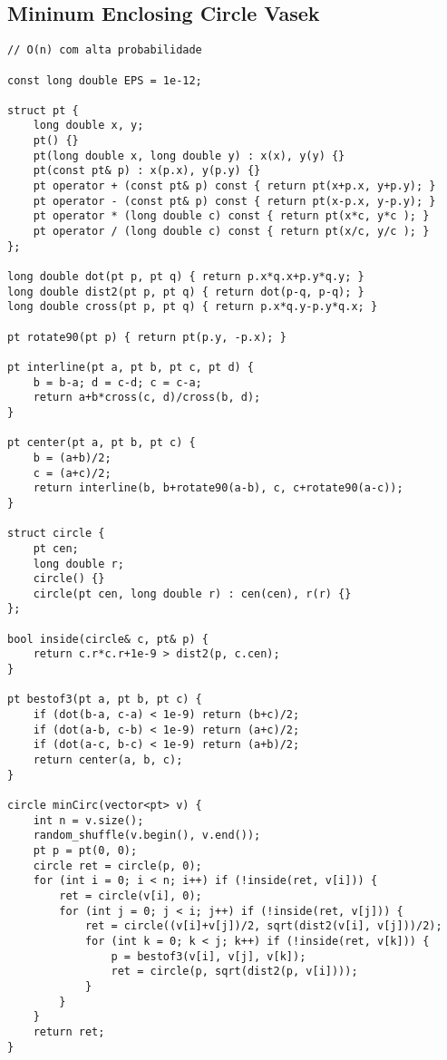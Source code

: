 \documentclass[12pt, a4paper, twoside]{article}
\begin{document}
\subsection{Mininum Enclosing Circle Vasek}
\begin{lstlisting}
// O(n) com alta probabilidade

const long double EPS = 1e-12;

struct pt {
	long double x, y;
	pt() {}
	pt(long double x, long double y) : x(x), y(y) {}
	pt(const pt& p) : x(p.x), y(p.y) {}
	pt operator + (const pt& p) const { return pt(x+p.x, y+p.y); }
	pt operator - (const pt& p) const { return pt(x-p.x, y-p.y); }
	pt operator * (long double c) const { return pt(x*c, y*c ); }
	pt operator / (long double c) const { return pt(x/c, y/c ); }
};

long double dot(pt p, pt q) { return p.x*q.x+p.y*q.y; }
long double dist2(pt p, pt q) { return dot(p-q, p-q); }
long double cross(pt p, pt q) { return p.x*q.y-p.y*q.x; }

pt rotate90(pt p) { return pt(p.y, -p.x); }

pt interline(pt a, pt b, pt c, pt d) {
	b = b-a; d = c-d; c = c-a;
	return a+b*cross(c, d)/cross(b, d);	
}

pt center(pt a, pt b, pt c) {
	b = (a+b)/2;
	c = (a+c)/2;
	return interline(b, b+rotate90(a-b), c, c+rotate90(a-c));	
}

struct circle {
	pt cen;
	long double r;
	circle() {}
	circle(pt cen, long double r) : cen(cen), r(r) {}
};

bool inside(circle& c, pt& p) {
	return c.r*c.r+1e-9 > dist2(p, c.cen);	
}

pt bestof3(pt a, pt b, pt c) {
	if (dot(b-a, c-a) < 1e-9) return (b+c)/2;
	if (dot(a-b, c-b) < 1e-9) return (a+c)/2;
	if (dot(a-c, b-c) < 1e-9) return (a+b)/2;
	return center(a, b, c);	
}

circle minCirc(vector<pt> v) {
	int n = v.size();
	random_shuffle(v.begin(), v.end());
	pt p = pt(0, 0);
	circle ret = circle(p, 0);
	for (int i = 0; i < n; i++) if (!inside(ret, v[i]))	{
		ret = circle(v[i], 0);
		for (int j = 0; j < i; j++) if (!inside(ret, v[j])) {
			ret = circle((v[i]+v[j])/2, sqrt(dist2(v[i], v[j]))/2);
			for (int k = 0; k < j; k++) if (!inside(ret, v[k])) {
				p = bestof3(v[i], v[j], v[k]);
				ret = circle(p, sqrt(dist2(p, v[i])));	
			}
		}	
	}
	return ret;
}
\end{lstlisting}



%
%
\end{document}
